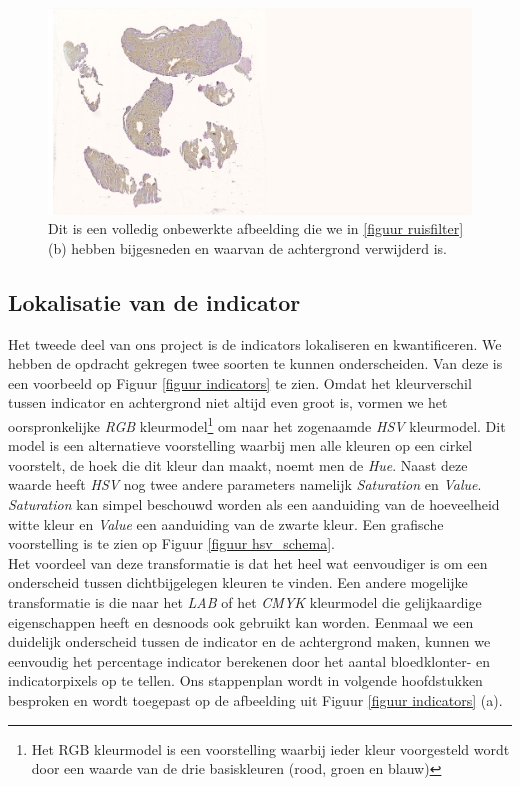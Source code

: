 \documentclass[a4paper,kulak]{kulakarticle}
\begin{document}
\begin{figure}[H]
	\centering
	\includegraphics[width=15.25cm]{Volledig_onbewerkt}
	
	\caption{Dit is een volledig onbewerkte afbeelding die we in \ref{figuur ruisfilter} (b) hebben bijgesneden en waarvan de achtergrond verwijderd is.}
	\label{figuur volledig_onbewerkt}
\end{figure}
\subsection{Lokalisatie van de indicator}
Het tweede deel van ons project is de indicators lokaliseren en kwantificeren. We hebben de opdracht gekregen twee soorten te kunnen onderscheiden. Van deze is een voorbeeld op Figuur \ref{figuur indicators} te zien. Omdat het kleurverschil tussen indicator en achtergrond niet altijd even groot is, vormen we het oorspronkelijke \textit{RGB} kleurmodel\footnote{Het RGB kleurmodel is een voorstelling waarbij ieder kleur voorgesteld wordt door een waarde van de drie basiskleuren (rood, groen en blauw)} om naar het zogenaamde \textit{HSV} kleurmodel. Dit model is een alternatieve voorstelling waarbij men alle kleuren op een cirkel voorstelt, de hoek die dit kleur dan maakt, noemt men de \textit{Hue}. Naast deze waarde heeft \textit{HSV} nog twee andere parameters namelijk \textit{Saturation} en \textit{Value}. \textit{Saturation} kan simpel beschouwd worden als een aanduiding van de hoeveelheid witte kleur en \textit{Value} een aanduiding van de zwarte kleur. Een grafische voorstelling is te zien op Figuur \ref{figuur hsv_schema}.\\
Het voordeel van deze transformatie is dat het heel wat eenvoudiger is om een onderscheid tussen dichtbijgelegen kleuren te vinden. Een andere mogelijke transformatie is die naar het \textit{LAB} of het \textit{CMYK} kleurmodel die gelijkaardige eigenschappen heeft en desnoods ook gebruikt kan worden. Eenmaal we een duidelijk onderscheid tussen de indicator en de achtergrond maken, kunnen we eenvoudig het percentage indicator berekenen door het aantal bloedklonter- en indicatorpixels op te tellen. Ons stappenplan wordt in volgende hoofdstukken besproken en wordt toegepast op de afbeelding uit Figuur \ref{figuur indicators} (a).
\end{document}
